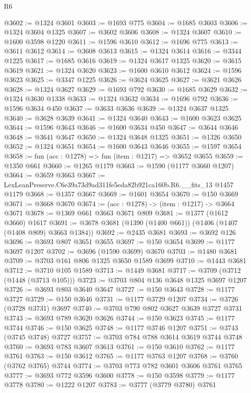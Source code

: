 \begin{lexlean}{R6}
\begin{coremodule}
@3602 := @1324 @3601
@3603 := @1693 @775
@3604 := @1685 @3603
@3606 := @1324 @3604 @1325
@3607 := @3602 @3606
@3608 := @1324 @3607
@3610 := @1600 @3598 @1220
@3611 := @1596 @3610
@3612 := @1696 @775
@3613 := @3611 @3612
@3614 := @3608 @3613
@3615 := @1324 @3614
@3616 := @3344 @1225
@3617 := @1685 @3616
@3619 := @1324 @3617 @1325
@3620 := @3615 @3619
@3621 := @1324 @3620
@3623 := @1600 @3610 @3612
@3624 := @1596 @3623
@3625 := @3347 @1225
@3626 := @3624 @3625
@3627 := @3621 @3626
@3628 := @1324 @3627
@3629 := @1693 @792
@3630 := @1685 @3629
@3632 := @1324 @3630 @1338
@3633 := @1324 @3632
@3634 := @1696 @792
@3636 := @1596 @3634 @450
@3637 := @3633 @3636
@3639 := @1324 @3637 @1325
@3640 := @3628 @3639
@3641 := @1324 @3640
@3643 := @1600 @3623 @3625
@3644 := @1596 @3643
@3646 := @1600 @3634 @450
@3647 := @3644 @3646
@3648 := @3641 @3647
@3650 := @1324 @3648 @1325
@3651 := @1326 @3650
@3652 := @1324 @3651
@3654 := @1600 @3643 @3646
@3655 := @1597 @3654
@3658 := fun (acc : @1278) => fun (item : @1217) => @3652 @3655
@3659 := @1350 @661
@3660 := @1265 @1179
@3663 := @1590 (@1177 @3660 @1207)
@3664 := @3659 @3663
@3667 := LexLeanPreserve.C6e39a73d9ad311fe5eda82b921ca160b.R6.__fits_13 @1457 @1179
@3668 := @1357 @3667
@3669 := @1601 @3654
@3670 := @150 @3669
@3671 := @3668 @3670
@3674 := (acc : @1278) -> (item : @1217) -> @3664 @3671
@3678 := @1369 @661 @3663 @3671 @809
@3681 := @1377 (@1612 @3660) @1617
@3691 := @3678 @3681 (@1390 (@1400 @661)) (@1406 (@1407 (@1408 @809) @3663 @1384))
@3692 := @2435 @3681
@3693 := @3692 @126
@3696 := @3693 @807 @3651 @3655
@3697 := @150 @3654
@3699 := @1177 @3697 @1207
@3702 := @3696 (@1590 @3699) @3670
@3703 := @1480 @3681
@3709 := @3703 @161 @806 @1325 @3650 @1589 @3699
@3710 := @1443 @3681
@3712 := @3710 @105 @1589
@3713 := @1449 @3681
@3717 := @3709 (@3712 (@1448 (@3713 @105)))
@3723 := @3703 @804 @136 @3648 @1325 @3697 @1207
@3726 := @3693 @803 @3640 @3647
@3727 := @150 @3643
@3728 := @1177 @3727
@3729 := @150 @3646
@3731 := @1177 @3729 @1207
@3734 := @3726 (@3728 @3731) @3697
@3740 := @3703 @790 @802 @3627 @3639 @3727 @3731
@3743 := @3693 @789 @3620 @3626
@3744 := @150 @3623
@3745 := @1177 @3744
@3746 := @150 @3625
@3748 := @1177 @3746 @1207
@3751 := @3743 (@3745 @3748) @3727
@3757 := @3703 @784 @788 @3614 @3619 @3744 @3748
@3760 := @3693 @783 @3607 @3613
@3761 := @150 @3610
@3762 := @1177 @3761
@3763 := @150 @3612
@3765 := @1177 @3763 @1207
@3768 := @3760 (@3762 @3765) @3744
@3774 := @3703 @773 @782 @3601 @3606 @3761 @3765
@3777 := @3693 @772 @3596 @3600
@3778 := @150 @3598
@3779 := @1177 @3778
@3780 := @1222 @1207
@3783 := @3777 (@3779 @3780) @3761

\end{coremodule}
\end{lexlean}
